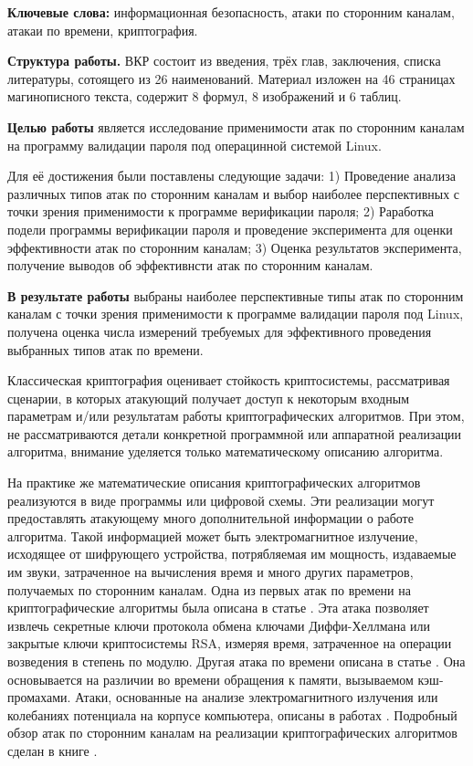 
\textbf{Ключевые слова:} информационная безопасность, атаки по сторонним каналам,
атакаи по времени, криптография.

\textbf{Структура работы.} ВКР состоит из введения, трёх глав, заключения, списка
литературы, сотоящего из 26 наименований. Материал изложен на 46 страницах
магинописного текста, содержит 8 формул, 8 изображений и 6 таблиц.

\textbf{Целью работы} является исследование применимости атак по сторонним
каналам на программу валидации пароля под операцинной системой Linux.

Для её достижения были поставлены следующие задачи: 1) Проведение анализа
различных типов атак по сторонним каналам и выбор наиболее перспективных
с точки зрения применимости к программе верификации пароля; 2) Раработка
подели программы верификации пароля и проведение эксперимента для оценки
эффективности атак по сторонним каналам; 3) Оценка результатов эксперимента,
получение выводов об эффективнсти атак по сторонним каналам.

\textbf{В результате работы} выбраны наиболее перспективные типы атак по
сторонним каналам с точки зрения применимости к программе валидации пароля
под Linux, получена оценка числа измерений требуемых для эффективного проведения
выбранных типов атак по времени.

\clearpage


Классическая криптография оценивает стойкость криптосистемы, рассматривая
сценарии, в которых атакующий получает доступ к некоторым входным параметрам
и/или результатам работы криптографических алгоритмов. При этом, не
рассматриваются детали конкретной программной или аппаратной реализации
алгоритма, внимание уделяется только математическому описанию алгоритма.

На практике же математические описания криптографических алгоритмов реализуются
в виде программы или цифровой схемы. Эти реализации могут предоставлять
атакующему много дополнительной информации о работе алгоритма. Такой информацией
может быть электромагнитное излучение, исходящее от шифрующего устройства,
потрябляемая им мощность, издаваемые им звуки, затраченное на вычисления время и
много других параметров, получаемых по сторонним каналам. Одна из первых атак по
времени на криптографические алгоритмы была описана в статье \cite{kocher}. Эта
атака позволяет извлечь секретные ключи протокола обмена ключами Диффи-Хеллмана
или закрытые ключи криптосистемы RSA, измеряя время, затраченное на операции
возведения в степень по модулю. Другая атака по времени описана в статье
\cite{bernstein}. Она основывается на различии во времени обращения к памяти,
вызываемом кэш-промахами. Атаки, основанные на анализе электромагнитного
излучения или колебаниях потенциала на корпусе компьютера, описаны в работах
\cite{hands} \cite{em}. Подробный обзор атак по сторонним каналам на реализации
криптографических алгоритмов сделан в книге \cite{cren}.

